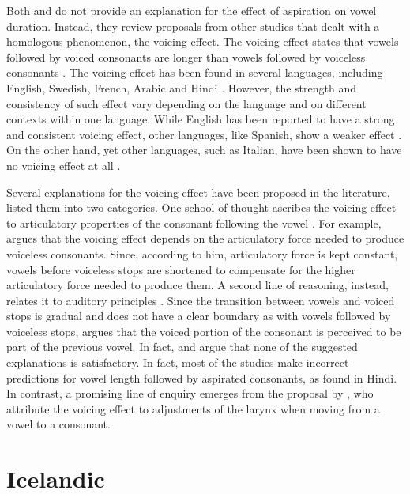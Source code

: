 \documentclass[11pt,a4paper,openany]{memoir}\usepackage[]{graphicx}\usepackage[]{color}
\begin{document}
Both \citet{maddieson1976} and \citet{durvasula2012} do not provide an explanation for the effect of aspiration on vowel duration.
Instead, they review proposals from other studies that dealt with a homologous phenomenon, the voicing effect.
The voicing effect states that vowels followed by voiced consonants are longer than vowels followed by voiceless consonants \citep{house1953,chen1970,hussein1994,durvasula2012}.
The voicing effect has been found in several languages, including English, Swedish, French, Arabic and Hindi \citep[191]{soskuthy2013}.
However, the strength and consistency of such effect vary depending on the language and on different contexts within one language.
While English has been reported to have a strong and consistent voicing effect, other languages, like Spanish, show a weaker effect \citep{hussein1994}.
On the other hand, yet other languages, such as Italian, have been shown to have no voicing effect at all \citep{esposito2002}.

Several explanations for the voicing effect have been proposed in the literature.
\citet{soskuthy2013} listed them into two categories.
One school of thought ascribes the voicing effect to articulatory properties of the consonant following the vowel \citep{belasco1953,chen1970}.
For example, \citep{belasco1953} argues that the voicing effect depends on the articulatory force needed to produce voiceless consonants.
Since, according to him, articulatory force is kept constant, vowels before voiceless stops are shortened to compensate for the higher articulatory force needed to produce them.
A second line of reasoning, instead, relates it to auditory principles \citep{javkin1976,kluender1988}.
Since the transition between vowels and voiced stops is gradual and does not have a clear boundary as with vowels followed by voiceless stops, \citep{javkin1976} argues that the voiced portion of the consonant is perceived to be part of the previous vowel.
In fact, \citet{maddieson1976} and \citet{durvasula2012} argue that none of the suggested explanations is satisfactory.
In fact, most of the studies make incorrect predictions for vowel length followed by aspirated consonants, as found in Hindi.
In contrast, a promising line of enquiry emerges from the proposal by \citet{chomsky1968}, who attribute the voicing effect to adjustments of the larynx when moving from a vowel to a consonant.


\section{Icelandic}
\end{document}

